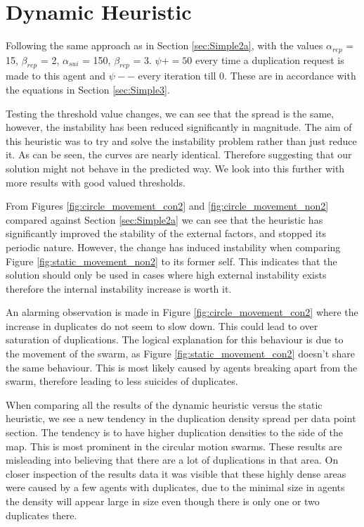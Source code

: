 \documentclass{UoYCSproject}
\begin{document}
\section{Dynamic Heuristic}
\label{sec:Simple3a}

Following the same approach as in Section \ref{sec:Simple2a}, with the values $\alpha_{rep}$ = 15, $\beta_{rep}$ = 2, $\alpha_{sui}$ = 150, $\beta_{rep}$ = 3. 
$\psi+=50$ every time a duplication request is made to this agent and $\psi--$ every iteration till 0.
These are in accordance with the equations in Section \ref{sec:Simple3}.

Testing the threshold value changes, we can see that the spread is the same, however, the instability has been reduced significantly in magnitude. 
The aim of this heuristic was to try and solve the instability problem rather than just reduce it. 
As can be seen, the curves are nearly identical. 
Therefore suggesting that our solution might not behave in the predicted way. 
We look into this further with more results with good valued thresholds.

From Figures \ref{fig:circle_movement_con2} and \ref{fig:circle_movement_non2} compared against Section \ref{sec:Simple2a} we can see that the heuristic has significantly improved the stability of the external factors, and stopped its periodic nature. 
However, the change has induced instability when comparing Figure \ref{fig:static_movement_non2} to its former self. 
This indicates that the solution should only be used in cases where high external instability exists therefore the internal instability increase is worth it.

An alarming observation is made in Figure \ref{fig:circle_movement_con2} where the increase in duplicates do not seem to slow down. 
This could lead to over saturation of duplications. 
The logical explanation for this behaviour is due to the movement of the swarm, as Figure \ref{fig:static_movement_con2} doesn’t share the same behaviour. 
This is most likely caused by agents breaking apart from the swarm, therefore leading to less suicides of duplicates.

When comparing all the results of the dynamic heuristic versus the static heuristic, we see a new tendency in the duplication density spread per data point section. 
The tendency is to have higher duplication densities to the side of the map. 
This is most prominent in the circular motion swarms. 
These results are misleading into believing that there are a lot of duplications in that area. 
On closer inspection of the results data it was visible that these highly dense areas were caused by a few agents with duplicates, due to the minimal size in agents the density will appear large in size even though there is only one or two duplicates there.  
\end{document}
